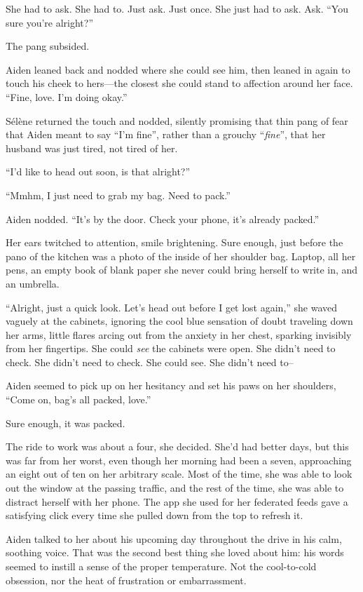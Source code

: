She had to ask. She had to. Just ask. Just once. She just had to ask. Ask. ``You sure you're alright?''

The pang subsided.

Aiden leaned back and nodded where she could see him, then leaned in again to touch his cheek to hers---the closest she could stand to affection around her face. ``Fine, love. I'm doing okay.''

Sélène returned the touch and nodded, silently promising that thin pang of fear that Aiden meant to say ``I'm fine'', rather than a grouchy ``\emph{fine}'', that her husband was just tired, not tired of her.

``I'd like to head out soon, is that alright?''

``Mmhm, I just need to grab my bag. Need to pack.''

Aiden nodded. ``It's by the door. Check your phone, it's already packed.''

Her ears twitched to attention, smile brightening. Sure enough, just before the pano of the kitchen was a photo of the inside of her shoulder bag. Laptop, all her pens, an empty book of blank paper she never could bring herself to write in, and an umbrella.

``Alright, just a quick look. Let's head out before I get lost again,'' she waved vaguely at the cabinets, ignoring the cool blue sensation of doubt traveling down her arms, little flares arcing out from the anxiety in her chest, sparking invisibly from her fingertips. She could \emph{see} the cabinets were open. She didn't need to check. She didn't need to check. She could see. She didn't need to--

Aiden seemed to pick up on her hesitancy and set his paws on her shoulders, ``Come on, bag's all packed, love.''

Sure enough, it was packed.

\secdiv{}

\noindent The ride to work was about a four, she decided. She'd had better days, but this was far from her worst, even though her morning had been a seven, approaching an eight out of ten on her arbitrary scale. Most of the time, she was able to look out the window at the passing traffic, and the rest of the time, she was able to distract herself with her phone. The app she used for her federated feeds gave a satisfying click every time she pulled down from the top to refresh it.

Aiden talked to her about his upcoming day throughout the drive in his calm, soothing voice. That was the second best thing she loved about him: his words seemed to instill a sense of the proper temperature. Not the cool-to-cold obsession, nor the heat of frustration or embarrassment.

